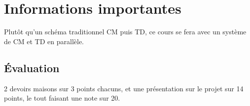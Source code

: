 \section{Informations importantes}
Plutôt qu'un schéma traditionnel CM puis TD, ce cours se fera avec un système de CM et TD en parallèle.

\subsection{Évaluation}
2 devoirs maisons sur 3 points chacuns, et une présentation sur le projet sur 14 points, le tout faisant une note sur
20.
